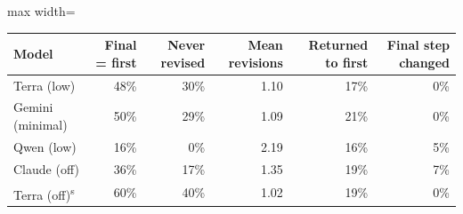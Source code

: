 \begin{adjustbox}{max width=\linewidth}
\begin{tabular}{@{}lrrrrr@{}}
\toprule
Model & Final = first & Never revised & Mean revisions & Returned to first & Final step changed \\
\midrule
Terra (low) & 48\% & 30\% & 1.10 & 17\% & 0\% \\
Gemini (minimal) & 50\% & 29\% & 1.09 & 21\% & 0\% \\
Qwen (low) & 16\% & 0\% & 2.19 & 16\% & 5\% \\
Claude (off) & 36\% & 17\% & 1.35 & 19\% & 7\% \\
Terra (off)\textsuperscript{s} & 60\% & 40\% & 1.02 & 19\% & 0\% \\
\bottomrule
\end{tabular}
\end{adjustbox}

\par{}
